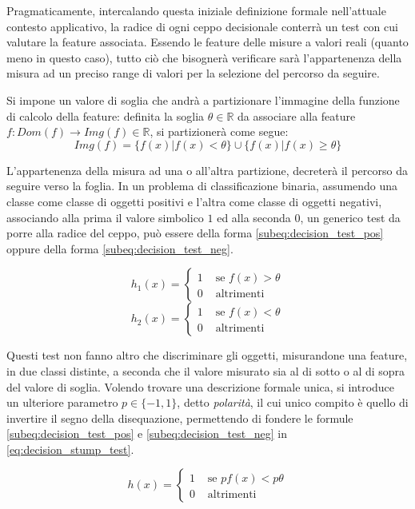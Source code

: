             Pragmaticamente, intercalando questa iniziale definizione formale nell'attuale contesto applicativo, la radice di ogni ceppo decisionale conterrà un test con cui valutare la feature associata.
            Essendo le feature delle misure a valori reali (quanto meno in questo caso), tutto ciò che bisognerà verificare sarà l'appartenenza della misura ad un preciso range di valori per la selezione del percorso da seguire.

            Si impone un valore di soglia che andrà a partizionare l'immagine della funzione di calcolo della feature: definita la soglia $\theta \in \mathbb{R}$ da associare alla feature $f:Dom(f) \rightarrow Img(f) \in \mathbb{R}$, si partizionerà come segue:
            $$Img(f) = \{f(x)|f(x) < \theta\} \cup \{f(x) | f(x) \geq \theta\}$$

            L'appartenenza della misura ad una o all'altra partizione, decreterà il percorso da seguire verso la foglia.
            In un problema di classificazione binaria, assumendo una classe come classe di oggetti positivi e l'altra come classe di oggetti negativi, associando alla prima il valore simbolico $1$ ed alla seconda $0$, un generico test da porre alla radice del ceppo, può essere della forma \ref{subeq:decision_test_pos} oppure della forma \ref{subeq:decision_test_neg}.

            \begin{equation}
                \label{subeq:decision_test_pos}
                h_1(x) =
                \begin{cases}
                    1 & \text{ se } f(x) > \theta \\
                    0 & \text{ altrimenti }
                \end{cases}
            \end{equation}
            \begin{equation}
                \label{subeq:decision_test_neg}
                h_2(x) = 
                \begin{cases}
                    1 & \text{ se } f(x) < \theta \\
                    0 & \text{ altrimenti }
                \end{cases}
            \end{equation}

            Questi test non fanno altro che discriminare gli oggetti, misurandone una feature, in due classi distinte, a seconda che il valore misurato sia al di sotto o al di sopra del valore di soglia.
            Volendo trovare una descrizione formale unica, si introduce un ulteriore parametro $p \in \{-1,1\}$, detto \emph{polarità}, il cui unico compito è quello di invertire il segno della disequazione, permettendo di fondere le formule \ref{subeq:decision_test_pos} e \ref{subeq:decision_test_neg} in \ref{eq:decision_stump_test}.

            \begin{equation}
                \label{eq:decision_stump_test}
                h(x) = 
                \begin{cases}
                    1 & \text{ se } pf(x) < p\theta \\
                    0 & \text{ altrimenti }
                \end{cases}
            \end{equation}

